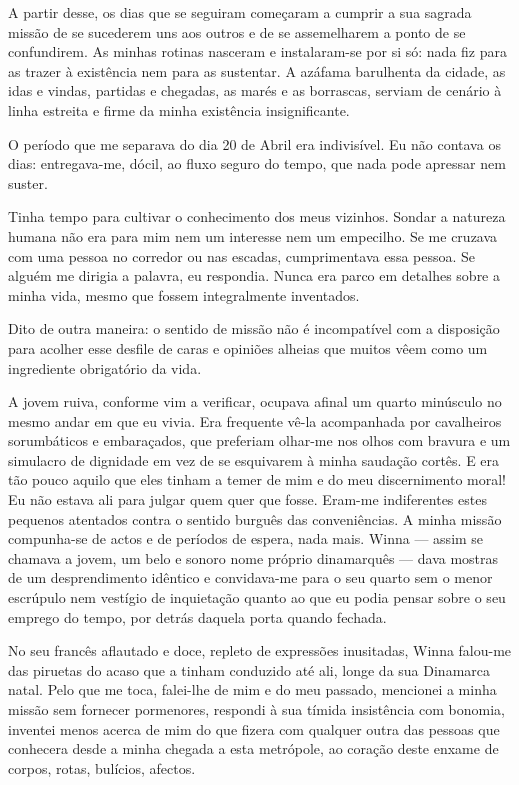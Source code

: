 A partir desse, os dias que se seguiram começaram a cumprir a sua
sagrada missão de se sucederem uns aos outros e de se assemelharem a
ponto de se confundirem. As minhas rotinas nasceram e instalaram-se
por si só: nada fiz para as trazer à existência nem para as sustentar. A
azáfama barulhenta da cidade, as idas e vindas, partidas e chegadas, as
marés e as borrascas, serviam de cenário à linha estreita e firme da
minha existência insignificante.

O período que me separava do dia 20 de Abril era indivisível. Eu não
contava os dias: entregava-me, dócil, ao fluxo seguro do tempo, que nada
pode apressar nem suster.

Tinha tempo para cultivar o conhecimento dos meus vizinhos. Sondar a
natureza humana não era para mim nem um
interesse nem um empecilho. Se me cruzava com uma pessoa no corredor ou
nas escadas, cumprimentava essa pessoa. Se alguém me dirigia a
palavra, eu respondia. Nunca era parco em detalhes sobre a minha vida,
mesmo que fossem integralmente inventados.

Dito de outra maneira: o sentido de missão não é incompatível com a
disposição para acolher esse desfile de caras e opiniões alheias que
muitos vêem como um ingrediente obrigatório da vida.

A jovem ruiva, conforme vim a verificar, ocupava afinal um quarto
minúsculo no mesmo andar em que eu vivia. Era frequente vê-la
acompanhada por cavalheiros sorumbáticos e embaraçados, que preferiam
olhar-me nos olhos com bravura e um simulacro de dignidade em vez de se
esquivarem à minha saudação cortês. E era tão pouco aquilo que eles
tinham a temer de mim e do meu discernimento moral! Eu não estava ali
para julgar quem quer que fosse. Eram-me indiferentes estes pequenos
atentados contra o sentido burguês das conveniências. A minha missão
compunha-se de actos e de períodos de espera, nada mais. Winna ---
assim se chamava a jovem, um belo e sonoro nome próprio dinamarquês ---
dava mostras de um desprendimento idêntico e convidava-me para o seu
quarto sem o menor escrúpulo nem vestígio de inquietação quanto ao que
eu podia pensar sobre o seu emprego do tempo, por detrás daquela porta
quando fechada.

No seu francês aflautado e doce, repleto de expressões inusitadas,
Winna falou-me das piruetas do acaso que a tinham conduzido até ali,
longe da sua Dinamarca natal. Pelo que me toca, falei-lhe de mim e do
meu passado, mencionei a minha missão sem fornecer pormenores, respondi
à sua tímida insistência com bonomia, inventei menos acerca de mim do
que
fizera com qualquer outra das pessoas que conhecera desde a minha
chegada a esta metrópole, ao coração deste enxame de corpos, rotas,
bulícios, afectos.

